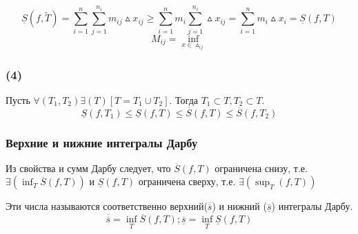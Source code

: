 $$\underline{S}(f,\tilde{T})=\sum_{i=1}^{n}\sum_{j=1}^{n_i}m_{ij}\vartriangle x_{ij} \geq \sum_{i=1}^{n}m_i\sum_{j=1}^{n_i}\vartriangle x_{ij}= \sum_{i=1}^{n}m_i\vartriangle x_i = \underline{S}(f,T)
$$
$$
M_{ij}=\inf_{x\in \vartriangle_{ij}}
$$
\dokno

\subsubsection{(4)}
Пусть $\forall(T_1,T_2)\exists(T)[T=T_1 \cup T_2].$ Тогда $T_1 \subset T, T_2 \subset T.$
$$\underline{S}(f,T_1) \leq \underline{S}(f,T) \leq \overline{S}(f,T) \leq \overline{S}(f,T_2)$$
\dokno

\subsubsection{Верхние и нижние интегралы Дарбу}
Из свойства и сумм Дарбу следует, что ${\overline{S}(f,T)}$ ограничена снизу, т.е. $\exists(\inf_{T}\overline{S}(f,T))$ и $\underline{S}(f,T)$ ограничена сверху, т.е. $\exists(\sup_{T}(f,T))$
\\
\begin{opred}
Эти числа называются соответственно верхний($\overline{\overline{s}}$) и нижний ($\underline{\overline{s}}$) интегралы Дарбу.
$$
\overline{\overline{s}}=\inf_{T}\overline{S}(f,T);\underline{\overline{s}}=\inf_{T}\underline{S}(f,T)
$$
\end{opred}

